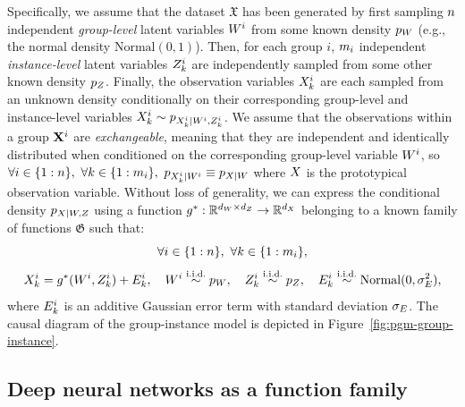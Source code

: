 \documentclass[../thesis.tex]{subfiles}
\begin{document}
Specifically, we assume that the dataset $\mathfrak{X}$ has been generated by first sampling $n$ independent \textit{group-level} latent variables $\myrv{w}^i$ from some known density $\myfunc{p}_{\myrv{w}}$ (e.g., the normal density $\mathrm{Normal}(0,1)$). Then, for each group $i$, $m_i$ independent \textit{instance-level} latent variables $\myrv{z}^i_k$ are independently sampled from some other known density $\myfunc{p}_{\myrv{z}}$. Finally, the observation variables $\myrv{x}^i_k$ are each sampled from an unknown density conditionally on their corresponding group-level and instance-level variables $\myrv{x}^i_k \sim \myfunc{p}_{\myrv{x}^i_k | \myrv{w}^i, \myrv{z}^i_k}$. We assume that the observations within a group $\mygroup{\myrv{x}}^i$ are \textit{exchangeable}, meaning that they are independent and identically distributed when conditioned on the corresponding group-level variable $\myrv{w}^i$, so $\forall i \in \{1:\mycnt{n}\}, ~ \forall k \in \{1:\mycnt{m}_i\}, ~ \myfunc{p}_{\myrv{x}^i_k | \myrv{w}^i} \equiv \myfunc{p}_{\myrv{x} | \myrv{w}}$ where $\myrv{x}$ is the prototypical observation variable. Without loss of generality, we can express the conditional density $\myfunc{p}_{\myrv{x} | \myrv{w}, \myrv{z}}$ using a function $\myfunc{g}^*: \mathbb{R}^{\mydim{w} \times \mydim{z}} \to \mathbb{R}^{\mydim{x}}$ belonging to a known family of functions $\mathfrak{G}$ such that:
\[  
    \forall i \in \{1:n\}, ~ \forall k \in \{1:m_i\}, 
\]
\[
    \myrv{x}^i_k = \myfunc{g}^* (\myrv{w}^i, \myrv{z}^i_k) + \myrv{e}^i_k, \quad \myrv{w}^i \overset{\text{i.i.d.}}{\sim} \myfunc{p}_{\myrv{w}}, \quad \myrv{z}^i_k \overset{\text{i.i.d.}}{\sim} \myfunc{p}_{\myrv{z}}, \quad \myrv{e}^i_k \overset{\text{i.i.d.}}{\sim} \mathrm{Normal}(0, \sigma^2_{\myrv{e}}),
\]
where $\myrv{e}^i_k$ is an additive Gaussian error term with standard deviation $\sigma_{\myrv{e}}$. The causal diagram of the group-instance model is depicted in Figure~\ref{fig:pgm-group-instance}.

\subsection{Deep neural networks as a function family}
\end{document}
